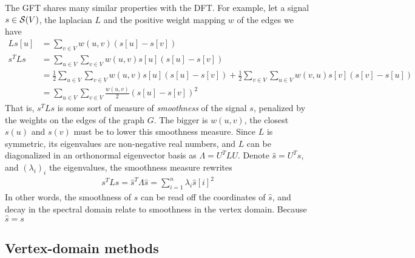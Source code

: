 The GFT shares many similar properties with the DFT. For example, let a signal $s \in \mathcal{S}(V)$, the laplacian $L$ and the positive weight mapping $w$ of the edges we have 
\begin{align}
Ls[u] &= \displaystyle\sum_{v \in V} w(u,v)(s[u] - s[v])\\
s^TLs &= \displaystyle\sum_{u \in V}\sum_{v \in V} w(u,v)s[u](s[u] - s[v])\nonumber\\
&= \displaystyle \frac{1}2\sum_{u \in V}\sum_{v \in V} w(u,v)s[u](s[u] - s[v]) + \frac{1}2\sum_{v \in V}\sum_{u \in V} w(v,u)s[v](s[v] - s[u])\nonumber\\
&=  \displaystyle\sum_{u \in V}\sum_{v \in V} \frac{w(u,v)}2(s[u] - s[v])^2
\end{align}
That is, $s^TLs$ is some sort of measure of \emph{smoothness} of the signal $s$, penalized by the weights on the edges of the graph $G$. The bigger is $w(u,v)$, the closest $s(u)$ and $s(v)$ must be to lower this smoothness measure. Since $L$ is symmetric, its eigenvalues are non-negative real numbers, and $L$ can be diagonalized in an orthonormal eigenvector basis as $\Lambda = U^TLU$. Denote $\hat{s} = U^Ts$, and $(\lambda_i)_i$ the eigenvalues, the smoothness measure rewrites
\begin{align}
s^TLs = \hat{s}^T\Lambda\hat{s} = \displaystyle\sum_{i=1}^n \lambda_i \hat{s}[i]^2
\end{align}
In other words, the smoothness of $s$ can be read off the coordinates of $\hat{s}$, and decay in the spectral domain relate to smoothness in the vertex domain. Because $\hat{s} = s$



\subsection{Vertex-domain methods}
\label{sec:vert}




